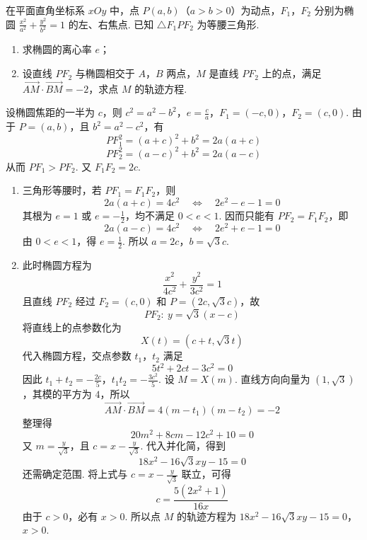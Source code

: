 \begin{problem}
在平面直角坐标系 \(xOy\) 中，点 \(P(a,b)\)（\(a>b>0\)）为动点，\(F_{1}\)，\(F_{2}\) 分别为椭圆 \(\frac{x^2}{a^2}+\frac{y^2}{b^2}=1\) 的左、右焦点. 已知 \(\triangle F_1PF_2\) 为等腰三角形.
\begin{enumerate}
\item 求椭圆的离心率 \(e\)；
\item 设直线 \(PF_{2}\) 与椭圆相交于 \(A\)，\(B\) 两点，\(M\) 是直线 \(PF_{2}\) 上的点，满足 \(\overrightarrow{AM}\cdot\overrightarrow{BM}=-2\)，求点 \(M\) 的轨迹方程.
\end{enumerate}
\begin{solution}
设椭圆焦距的一半为 \(c\)，则
\(c^2=a^2-b^2\)，\(e=\frac ca\)，\(F_1=(-c,0)\)，\(F_2=(c,0)\).
由于 \(P=(a,b)\)，且 \(b^2=a^2-c^2\)，有
\[
PF_1^2=(a+c)^2+b^2=2a(a+c)
\]
\[
PF_2^2=(a-c)^2+b^2=2a(a-c)
\]
从而 \(PF_1>PF_2\). 又 \(F_1F_2=2c\).

\begin{enumerate}
\item 三角形等腰时，若 \(PF_1=F_1F_2\)，则
\[
2a(a+c)=4c^2
\quad\Longleftrightarrow\quad
2e^2-e-1=0
\]
其根为 \(e=1\) 或 \(e=-\frac{1}{2}\)，均不满足 \(0<e<1\). 因而只能有
\(PF_2=F_1F_2\)，即
\[
2a(a-c)=4c^2
\quad\Longleftrightarrow\quad
2e^2+e-1=0
\]
由 \(0<e<1\)，得 \(e=\frac{1}{2}\). 所以
\(a=2c\)，\(b=\sqrt3c\).

\item 此时椭圆方程为
\[
\frac{x^2}{4c^2}+\frac{y^2}{3c^2}=1
\]
且直线 \(PF_2\) 经过 \(F_2=(c,0)\) 和 \(P=(2c,\sqrt3c)\)，故
\[
PF_2:\ y=\sqrt3(x-c)
\]
将直线上的点参数化为
\[
X(t)=(c+t,\sqrt3t)
\]
代入椭圆方程，交点参数 \(t_1\)，\(t_2\) 满足
\[
5t^2+2ct-3c^2=0
\]
因此
\(t_1+t_2=-\frac{2c}{5}\)，\(t_1t_2=-\frac{3c^2}{5}\).
设 \(M=X(m)\). 直线方向向量为 \((1,\sqrt3)\)，其模的平方为 \(4\)，所以
\[
\overrightarrow{AM}\cdot\overrightarrow{BM}
=4(m-t_1)(m-t_2)=-2
\]
整理得
\[
20m^2+8cm-12c^2+10=0
\]
又 \(m=\frac{y}{\sqrt3}\)，且 \(c=x-\frac{y}{\sqrt3}\). 代入并化简，得到
\[
18x^2-16\sqrt3xy-15=0
\]
还需确定范围. 将上式与 \(c=x-\frac{y}{\sqrt3}\) 联立，可得
\[
c=\frac{5(2x^2+1)}{16x}
\]
由于 \(c>0\)，必有 \(x>0\). 所以点 \(M\) 的轨迹方程为
\(18x^2-16\sqrt3xy-15=0\)，\(x>0\).
\end{enumerate}
\end{solution}
\end{problem}

